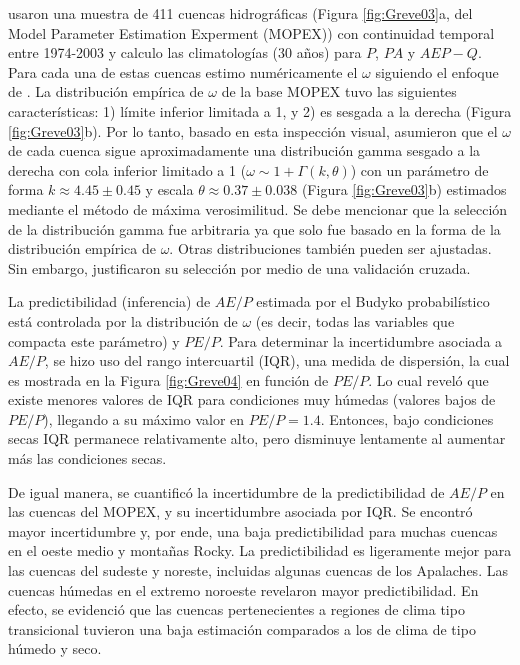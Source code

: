 \documentclass[12pt]{article}
\begin{document}
\citet{Greve2015} usaron una muestra de 411 cuencas hidrográficas (Figura \ref{fig:Greve03}a, del Model Parameter Estimation Experment (MOPEX)) con continuidad temporal entre 1974-2003 y calculo las climatologías (30 años) para $P$, $PA$ y $AE P - Q$. Para cada una de estas cuencas estimo numéricamente el $\omega$ siguiendo el enfoque de \citet{Zhang2004}. La distribución empírica de $\omega$ de la base MOPEX tuvo las siguientes características: 1) límite inferior limitada a 1, y 2) es sesgada a la derecha (Figura \ref{fig:Greve03}b). Por lo tanto, basado en esta inspección visual, \citet{Greve2015} asumieron que el $\omega$ de cada cuenca sigue aproximadamente una distribución gamma sesgado a la derecha con cola inferior limitado a 1 ($\omega \sim 1 + \Gamma (k, \theta )$) con un parámetro de forma $k \approx 4.45 \pm 0.45$ y escala $\theta \approx 0.37 \pm 0.038$ (Figura \ref{fig:Greve03}b) estimados mediante el método de máxima verosimilitud. Se debe mencionar que la selección de la distribución gamma fue arbitraria ya que solo fue basado en la forma de la distribución empírica de $\omega$. Otras distribuciones también pueden ser ajustadas. Sin embargo, \citet{Greve2015} justificaron su selección por medio de una validación cruzada.

La predictibilidad (inferencia) de $AE/P$ estimada por el Budyko probabilístico está controlada por la distribución de $\omega$ (es decir, todas las variables que compacta este parámetro) y $PE/P$. Para determinar la incertidumbre asociada a $AE/P$, se hizo uso del rango intercuartil (IQR), una medida de dispersión, la cual es mostrada en la Figura \ref{fig:Greve04} en función de $PE/P$. Lo cual reveló que existe menores valores de IQR para condiciones muy húmedas (valores bajos de $PE/P$), llegando a su máximo valor en $PE/P = 1.4$. Entonces, bajo condiciones secas IQR permanece relativamente alto, pero disminuye lentamente al aumentar más las condiciones secas. %

De igual manera, se cuantificó la incertidumbre de la predictibilidad de $AE/P$ en las cuencas del MOPEX, y su incertidumbre asociada por IQR. Se encontró mayor incertidumbre y, por ende, una baja predictibilidad para muchas cuencas en el oeste medio y montañas Rocky. La predictibilidad es ligeramente mejor para las cuencas del sudeste y noreste, incluidas algunas cuencas de los Apalaches. Las cuencas húmedas en el extremo noroeste revelaron mayor predictibilidad. En efecto, se evidenció que las cuencas pertenecientes a regiones de clima tipo transicional tuvieron una baja estimación comparados a los de clima de tipo húmedo y seco.
\end{document}
